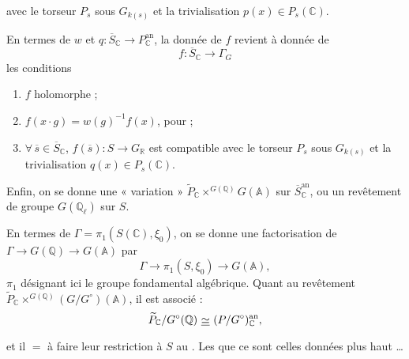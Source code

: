 \documentclass[11pt,a4paper]{article}
\begin{document}

avec le torseur $P_{s}$ sous $G_{k(s)}$ et la trivialisation
$p(x) \in P_{s}(\mathbb{C})$.

En termes de $w$ et $q : \overline{S}_{\mathbb{C}} \to P_{\mathbb{C}}^{\mathrm{an}}$,
la donnée de $f$ revient à  donnée de
\[ f : \overline{S}_{\mathbb{C}} \longrightarrow \Gamma_{G} \]
   les conditions

\begin{enumerate}
  \item[a)] $f$ holomorphe ;
  \item[b)] $f(x \cdot g) = w(g)^{-1} f(x)$, pour \ill{} ;
  \item[c)]  $\forall\, \overline{s} \in \overline{S}_{\mathbb{C}}$,
  $f(\overline{s}) : S \to G_{\mathbb{R}}$ est compatible avec le
  torseur $P_{s}$ sous $G_{k(s)}$ et la trivialisation $q(x) \in P_{s}(\mathbb{C})$.
\end{enumerate}

Enfin,  \ill{} on se donne une « variation »
 $\widetilde{P}_{\mathbb{C}} \times^{G(\mathbb{Q})} G(\mathbb{A})$
sur $\overline{S}_{\mathbb{C}}^{\mathrm{an}}$, ou un revêtement \ill{} de groupe
$G(\mathbb{Q}_{\ell})$ sur $S$.


En termes de  $\Gamma = \pi_{1}(S(\mathbb{C}), \xi_{0})$, on
se donne une factorisation de $\Gamma \to G(\mathbb{Q}) \longrightarrow G(\mathbb{A})$ par
\[ \Gamma \longrightarrow \pi_{1}(S, \xi_{0}) \longrightarrow G(\mathbb{A}) , \]
$\pi_{1}$ désignant ici le groupe fondamental algébrique. Quant au revêtement
$\widetilde{P}_{\mathbb{C}} \times^{G(\mathbb{Q})} (G/G^{\circ})(\mathbb{A})$, il
est \ill{}  associé :
\[ \widetilde{P}_{\mathbb{C}} / G^{\circ}(\mathbb{Q}) \ \struck{\simeq} \ (P/G^{\circ})_{\mathbb{C}}^{\mathrm{an}} , \]
 et il \ill{} $=$ \ill{} à faire leur restriction à $S$
 au \ill{}. Les \ill{} que ce sont celles données plus haut …


\end{document}
